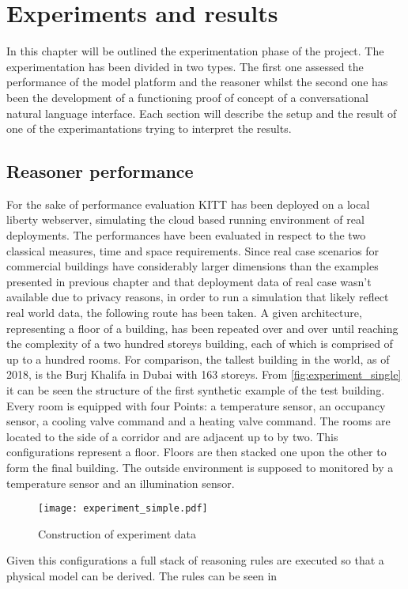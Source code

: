 \chapter{Experiments and results}
In this chapter will be outlined the experimentation phase of the project.
The experimentation has been divided in two types. The first one assessed the performance of the model platform and the reasoner whilst the second one has been the development of a functioning proof of concept of a conversational natural language interface.
Each section will describe the setup and the result of one of the experimantations trying to interpret the results.
\section{Reasoner performance}
For the sake of performance evaluation KITT has been deployed on a local liberty webserver, simulating the cloud based running environment of real deployments.
The performances have been evaluated in respect to the two classical measures, time and space requirements. Since real case scenarios for commercial buildings have considerably larger dimensions than the examples presented in previous chapter and that deployment data of real case wasn't available due to privacy reasons, in order to run a simulation that likely reflect real world data, the following route has been taken.
A given architecture, representing a floor of a building, has been repeated over and over until reaching the complexity of a two hundred storeys building, each of which is comprised of up to a hundred rooms. For comparison, the tallest building in the world, as of 2018, is the Burj Khalifa in Dubai with 163 storeys. From \autoref{fig:experiment_single} it can be seen the structure of the first synthetic example of the test building. Every room is equipped with four Points: a temperature sensor, an occupancy sensor, a cooling valve command and a heating valve command. The rooms are located to the side of a corridor and are adjacent up to by two. This configurations represent a floor. Floors are then stacked one upon the other to form the final building. The outside environment is supposed to monitored by a temperature sensor and an illumination sensor.
\begin{figure}
  \centering
  \texttt{[image: experiment\_simple.pdf]}
  \caption{Construction of experiment data}
  \label{fig:experiment_single}
\end{figure}
Given this configurations a full stack of reasoning rules are executed so that a physical model can be derived. The rules can be seen in %

